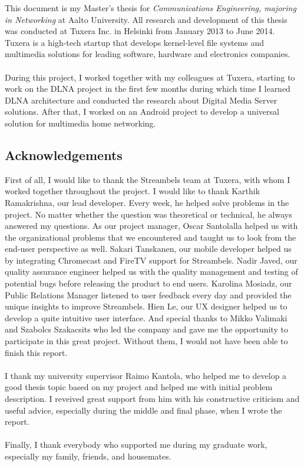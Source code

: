 
This document is my Master's thesis for \textit{Communications Engineering, majoring in
Networking} at Aalto University. All research and development of this thesis was
conducted at Tuxera Inc. in Helsinki from January 2013 to June 2014. Tuxera is a
high-tech startup that develops kernel-level file systems and multimedia solutions
for leading software, hardware and electronics companies.\\
\\
During this project, I worked together with my colleagues at Tuxera, starting
to work on the DLNA project in the first few months during which time I learned
DLNA architecture and conducted the research about Digital Media Server solutions.
After that, I worked on an Android project to develop a universal solution for
multimedia home networking.
\subsection*{Acknowledgements}
First of all, I would like to thank the Streambels team at Tuxera, with whom I worked
together throughout the project. I would like to thank Karthik Ramakrishna, our
lead developer. Every week, he helped solve problems in the project.
No matter whether the question was theoretical or technical, he always answered my
questions. As our project manager, Oscar Santolalla helped us with
the organizational problems that we encountered and taught us to look from the
end-user perspective as well. Sakari Tanskanen, our mobile developer helped us
by integrating Chromecast and FireTV support for Streambels. Nadir Javed, our
quality assurance engineer helped us with the quality management and testing of
potential bugs before releasing the product to end users. Karolina Mosiadz, our
Public Relations Manager listened to user feedback every day and provided the unique
insights to improve Streambels. Hien Le, our UX designer helped us to develop
a quite intuitive user interface. And special thanks to Mikko Valimaki and Szabolcs
Szakacsits who led the company and gave me the opportunity to participate in
this great project. Without them, I would not have been able to finish this
report.\\
\\
I thank my university supervisor Raimo Kantola, who helped me to develop a good
thesis topic based on my project and helped me with initial problem description.
I reveived great support from him with his constructive criticism and useful advice, especially
during the middle and final phase, when I wrote the report.\\
\\
Finally, I thank everybody who supported me during my graduate work,
especially my family, friends, and housemates.
